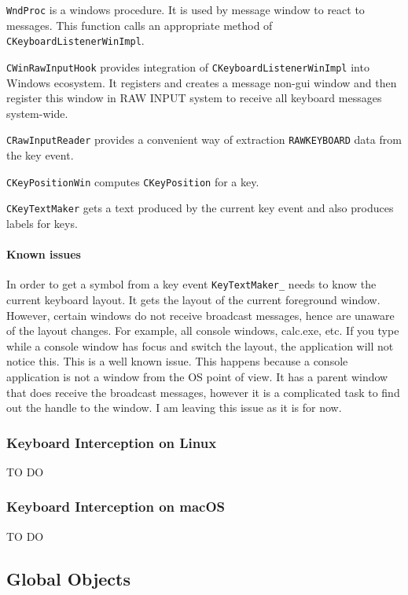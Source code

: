\documentclass{article}
\begin{document}
\verb"WndProc" is a windows procedure. It is used by message window to react to messages. This function calls an appropriate method of \verb"CKeyboardListenerWinImpl".

\verb"CWinRawInputHook" provides integration of \verb"CKeyboardListenerWinImpl" into Windows ecosystem. It registers and creates a message non-gui window and then register this window in RAW INPUT system to receive all keyboard messages system-wide.

\verb"CRawInputReader" provides a convenient way of extraction \verb"RAWKEYBOARD" data from the key event.

\verb"CKeyPositionWin" computes \verb"CKeyPosition" for a key.

\verb"CKeyTextMaker" gets a text produced by the current key event and also produces labels for keys.

\paragraph{Known issues}

In order to get a symbol from a key event \verb"KeyTextMaker_" needs to know the current keyboard layout. It gets the layout of the current foreground window. However, certain windows do not receive broadcast messages, hence are unaware of the layout changes. For example, all console windows, calc.exe, etc. If you type while a console window has focus and switch the layout, the application will not notice this. This is a well known issue. This happens because a console application is not a window from the OS point of view. It has a parent window that does receive the broadcast messages, however it is a complicated task to find out the handle to the window. I am leaving this issue as it is for now.

\subsubsection{Keyboard Interception on Linux}

TO DO

\subsubsection{Keyboard Interception on macOS}

TO DO


\subsection{Global Objects}
\end{document}
